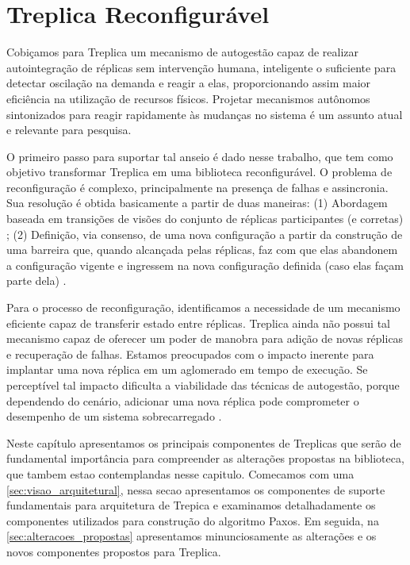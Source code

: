 \chapter{Treplica Reconfigurável}\label{cap2}

Cobiçamos para Treplica um mecanismo de autogestão capaz de realizar autointegração de
réplicas sem intervenção humana, inteligente o suficiente para detectar oscilação na
demanda e reagir a elas, proporcionando assim maior eficiência na utilização de recursos
físicos. Projetar mecanismos autônomos sintonizados para reagir rapidamente às mudanças no
sistema é um assunto atual e relevante para pesquisa.

O primeiro passo para suportar tal anseio é dado nesse trabalho, que tem como objetivo
transformar Treplica em uma biblioteca reconfigurável. O problema de reconfiguração é
complexo, principalmente na presença de falhas e assincronia. Sua resolução é obtida
basicamente a partir de duas maneiras: (1) Abordagem baseada em transições de visões do
conjunto de réplicas participantes (e corretas) \cite{birman87a, birman87b}; (2)
Definição, via consenso, de uma nova configuração a partir da construção de uma barreira
que, quando alcançada pelas réplicas, faz com que elas abandonem a configuração vigente e
ingressem na nova configuração definida (caso elas façam parte dela) \cite{lamport10}.

Para o processo de reconfiguração, identificamos a necessidade de um mecanismo eficiente
capaz de transferir estado entre réplicas. Treplica ainda não possui tal mecanismo capaz
de oferecer um poder de manobra para adição de novas réplicas e recuperação de falhas.
Estamos preocupados com o impacto inerente para implantar uma nova réplica em um
aglomerado em tempo de execução. Se perceptível tal impacto dificulta a viabilidade das
técnicas de autogestão, porque dependendo do cenário, adicionar uma nova réplica pode
comprometer o desempenho de um sistema sobrecarregado \cite{vilaca09}.

Neste capítulo apresentamos os principais componentes de Treplicas que serão de
fundamental importância para compreender as alterações propostas na biblioteca, que tambem
estao contemplandas nesse capitulo. Comecamos com uma \autoref{sec:visao_arquitetural},
nessa secao apresentamos os componentes de suporte fundamentais para arquitetura de
Trepica e examinamos detalhadamente os componentes utilizados para construção do algoritmo
Paxos. Em seguida, na \autoref{sec:alteracoes_propostas} apresentamos minunciosamente as
alterações e os novos componentes propostos para Treplica.


